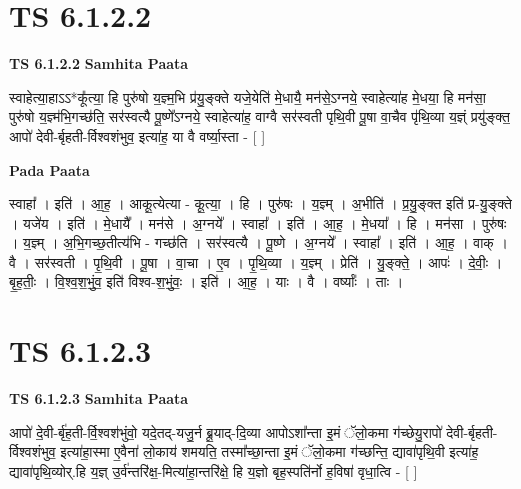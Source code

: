 \documentclass[17pt]{extarticle}
\begin{document}

\section{ TS 6.1.2.2 }

\textbf{TS 6.1.2.2 } \newline
\textbf{Samhita Paata} \newline

स्वाहेत्या॒हाऽऽ*कू᳚त्या॒ हि पुरु॑षो य॒ज्ञ्म॒भि प्र॑यु॒ङ्क्ते यजे॒येति॑ मे॒धायै॒ मन॑से॒ऽग्नये॒ स्वाहेत्या॑ह मे॒धया॒ हि मन॑सा॒ पुरु॑षो य॒ज्ञ्म॑भि॒गच्छ॑ति॒ सर॑स्वत्यै पू॒ष्णे᳚ऽग्नये॒ स्वाहेत्या॑ह॒ वाग्वै सर॑स्वती पृथि॒वी पू॒षा वा॒चैव पृ॑थि॒व्या य॒ज्ञ्ं प्रयु॑ङ्क्त॒ आपो॑ देवी-र्बृहती-र्विश्वशंभुव॒ इत्या॑ह॒ या वै वर्ष्या॒स्ता - [  ] \newline

\textbf{Pada Paata} \newline

स्वाहा᳚ । इति॑ । आ॒ह॒ । आकू॒त्येत्या - कू॒त्या॒ । हि । पुरु॑षः । य॒ज्ञ्म् । अ॒भीति॑ । प्र॒यु॒ङ्क्त इति॑ प्र-यु॒ङ्क्ते । यजे॑य । इति॑ । मे॒धायै᳚ । मन॑से । अ॒ग्नये᳚ । स्वाहा᳚ । इति॑ । आ॒ह॒ । मे॒धया᳚ । हि । मन॑सा । पुरु॑षः । य॒ज्ञ्म् । अ॒भि॒गच्छ॒तीत्य॑भि - गच्छ॑ति । सर॑स्वत्यै । पू॒ष्णे । अ॒ग्नये᳚ । स्वाहा᳚ । इति॑ । आ॒ह॒ । वाक् । वै । सर॑स्वती । पृ॒थि॒वी । पू॒षा । वा॒चा । ए॒व । पृ॒थि॒व्या । य॒ज्ञ्म् । प्रेति॑ । यु॒ङ्क्ते॒ । आपः॑ । दे॒वीः॒ । बृ॒ह॒तीः॒ । वि॒श्व॒श॒भुं॒व॒ इति॑ विश्व-श॒भुं॒वः॒ । इति॑ । आ॒ह॒ । याः । वै । वर्ष्याः᳚ । ताः ।  \newline





\section{ TS 6.1.2.3 }

\textbf{TS 6.1.2.3 } \newline
\textbf{Samhita Paata} \newline

आपो॑ दे॒वी-र्बृ॑ह॒ती-र्वि॒श्वश॑भुंवो॒ यदे॒तद्-यजु॒र्न ब्रू॒याद्-दि॒व्या आपोऽशा᳚न्ता इ॒मं ॅलो॒कमा ग॑च्छेयु॒रापो॑ देवी-र्बृहती-र्विश्वशंभुव॒ इत्या॑हा॒स्मा ए॒वैना॑ लो॒काय॑ शमयति॒ तस्मा᳚च्छा॒न्ता इ॒मं ॅलो॒कमा ग॑च्छन्ति॒ द्यावा॑पृथि॒वी इत्या॑ह॒ द्यावा॑पृथि॒व्योर्.हि य॒ज्ञ् उ॒र्व॑न्तरि॑क्ष॒-मित्या॑हा॒न्तरि॑क्षे॒ हि य॒ज्ञो बृह॒स्पति॑र्नो ह॒विषा॑ वृधा॒त्वि - [  ] \newline
\end{document}
